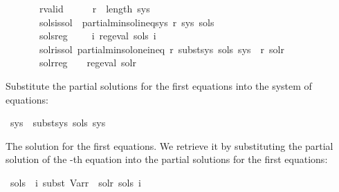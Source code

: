 \begin{isabellebody}
\ \ \ \ \ \ \ r{\isacharunderscore}{\kern0pt}valid{\isacharcolon}{\kern0pt}\ \ \ \ \ \ {\isachardoublequoteopen}r\ {\isacharless}{\kern0pt}\ length\ sys{\isachardoublequoteclose}\isanewline
\ \ \ \ \ \ \ sols{\isacharunderscore}{\kern0pt}is{\isacharunderscore}{\kern0pt}sol{\isacharcolon}{\kern0pt}\ \ {\isachardoublequoteopen}partial{\isacharunderscore}{\kern0pt}min{\isacharunderscore}{\kern0pt}sol{\isacharunderscore}{\kern0pt}ineq{\isacharunderscore}{\kern0pt}sys\ r\ sys\ sols{\isachardoublequoteclose}\isanewline
\ \ \ \ \ \ \ sols{\isacharunderscore}{\kern0pt}reg{\isacharcolon}{\kern0pt}\ \ \ \ \ {\isachardoublequoteopen}{\isasymforall}i{\isachardot}{\kern0pt}\ reg{\isacharunderscore}{\kern0pt}eval\ {\isacharparenleft}{\kern0pt}sols\ i{\isacharparenright}{\kern0pt}{\isachardoublequoteclose}\isanewline
\ \ \ \ \ \ \ sol{\isacharunderscore}{\kern0pt}r{\isacharunderscore}{\kern0pt}is{\isacharunderscore}{\kern0pt}sol{\isacharcolon}{\kern0pt}\ {\isachardoublequoteopen}partial{\isacharunderscore}{\kern0pt}min{\isacharunderscore}{\kern0pt}sol{\isacharunderscore}{\kern0pt}one{\isacharunderscore}{\kern0pt}ineq\ r\ {\isacharparenleft}{\kern0pt}subst{\isacharunderscore}{\kern0pt}sys\ sols\ sys\ {\isacharbang}{\kern0pt}\ r{\isacharparenright}{\kern0pt}\ sol{\isacharunderscore}{\kern0pt}r{\isachardoublequoteclose}\isanewline
\ \ \ \ \ \ \ sol{\isacharunderscore}{\kern0pt}r{\isacharunderscore}{\kern0pt}reg{\isacharcolon}{\kern0pt}\ \ \ \ {\isachardoublequoteopen}reg{\isacharunderscore}{\kern0pt}eval\ sol{\isacharunderscore}{\kern0pt}r{\isachardoublequoteclose}\isanewline
{}%
\begin{isamarkuptext}%
Substitute the partial solutions for the first  equations into the system of equations:%
\end{isamarkuptext}\isamarkuptrue%
\isamarkupfalse%
\ {\isachardoublequoteopen}sys{\isacharprime}{\kern0pt}\ {\isasymequiv}\ subst{\isacharunderscore}{\kern0pt}sys\ sols\ sys{\isachardoublequoteclose}%
\begin{isamarkuptext}%
The solution for the first  equations. We retrieve it by substituting the partial
solution of the -th equation into the partial solutions for the first  equations:%
\end{isamarkuptext}\isamarkuptrue%
\isamarkupfalse%
\ {\isachardoublequoteopen}sols{\isacharprime}{\kern0pt}\ {\isasymequiv}\ {\isasymlambda}i{\isachardot}{\kern0pt}\ subst\ {\isacharparenleft}{\kern0pt}Var{\isacharparenleft}{\kern0pt}r\ {\isacharcolon}{\kern0pt}{\isacharequal}{\kern0pt}\ sol{\isacharunderscore}{\kern0pt}r{\isacharparenright}{\kern0pt}{\isacharparenright}{\kern0pt}\ {\isacharparenleft}{\kern0pt}sols\ i{\isacharparenright}{\kern0pt}{\isachardoublequoteclose}\isanewline

\end{isabellebody}
